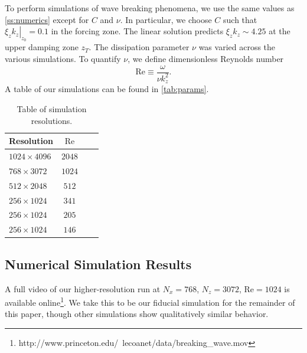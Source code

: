 \documentclass[
        fleqn,
        usenatbib,
    ]{mnras}
\newcommand*{\at}[1]{\left.#1\right|}
\begin{document}

To perform simulations of wave breaking phenomena, we use the same values as
\autoref{ss:numerics} except for $C$ and $\nu$. In particular, we choose $C$
such that $\at{\xi_z k_z}_{z_0} = 0.1$ in the forcing zone. The linear solution
predicts $\xi_z k_z \sim 4.25$ at the upper damping zone $z_T$. The dissipation
parameter $\nu$ was varied across the various simulations. To quantify $\nu$, we
define dimensionless Reynolds number
\begin{equation}
    \mathrm{Re}  \equiv \frac{\omega}{\nu k_{z}^2}. \label{eq:re_def}
\end{equation}
A table of our simulations can be found in \autoref{tab:params}.
\begin{table}
    \centering
    \begin{tabular}{l c c c}
        Resolution & $\mathrm{Re}$\\\bottomrule
        $1024 \times 4096$ & $2048$\\
        $768 \times 3072$ & $1024$\\
        $512 \times 2048$ & $512$\\
        $256 \times 1024$ & $341$\\
        $256 \times 1024$ & $205$\\
        $256 \times 1024$ & $146$\\
    \end{tabular}
    \caption{Table of simulation resolutions.}\label{tab:params}
\end{table}

\subsection{Numerical Simulation Results}\label{ss:nl_ns}

A full video of our higher-resolution run at $N_x = 768$, $N_z = 3072$,
$\mathrm{Re} = 1024$ is available
online\footnote{http://www.princeton.edu/~lecoanet/data/breaking\_wave.mov}. We
take this to be our fiducial simulation for the remainder of this paper, though
other simulations show qualitatively similar behavior.
\end{document}

